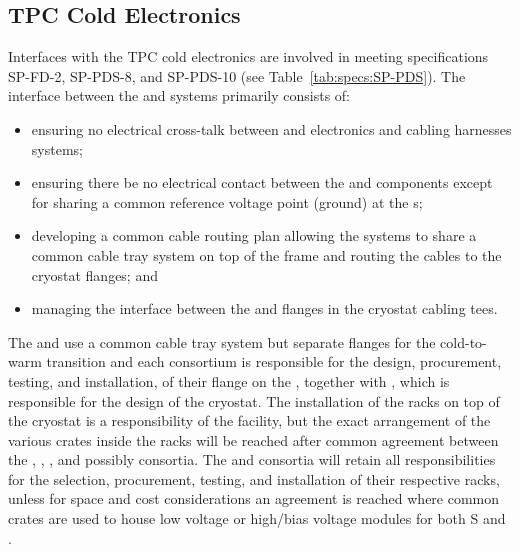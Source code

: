 \subsection{TPC Cold Electronics}
\label{sec:fdsp-pd-intfc-ce}



Interfaces with the TPC cold electronics are involved in meeting specifications SP-FD-2, SP-PDS-8, and SP-PDS-10 (see Table~\ref{tab:specs:SP-PDS}).  The interface between the  and  systems primarily consists of:

\begin{itemize}
    \item ensuring no electrical cross-talk between  and  electronics and cabling harnesses systems;
    \item ensuring there be no electrical contact between the  and  components except for sharing a common reference voltage point (ground) at the \fdth{}s;
    \item developing a common cable routing plan allowing the systems to share a common cable tray system on top of the  frame and routing the cables to the cryostat flanges; and 



    \item managing the interface between the  and  flanges in the cryostat cabling tees.
  
  \end{itemize}  
The  and  use a common cable tray system but separate flanges for the cold-to-warm transition and each consortium is responsible for the design, procurement, testing, and installation, of their flange on the \fdth{}, together with , which is responsible for the design of the cryostat. 
The installation of the racks on top of the cryostat is a responsibility of the facility, but the exact arrangement of the various crates inside the racks will be reached after common agreement between the , , , and possibly  consortia. The  and  consortia will retain all responsibilities for the selection, procurement, testing, and installation of their respective racks, unless for space and cost considerations an agreement is reached where common crates are used to house low voltage or high/bias voltage modules for both S and . 






